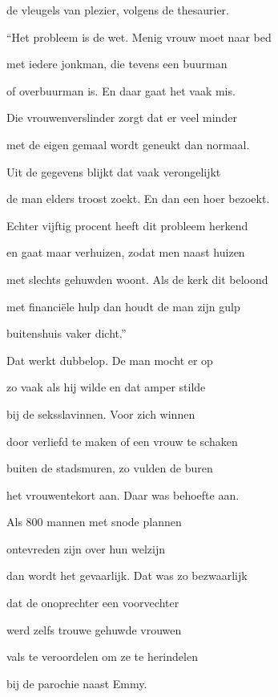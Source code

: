 de vleugels van plezier,
volgens de thesaurier.

“Het probleem is de wet.
Menig vrouw moet naar bed

met iedere jonkman,
die tevens een buurman

of overbuurman is.
En daar gaat het vaak mis.

Die vrouwenverslinder
zorgt dat er veel minder

met de eigen gemaal
wordt geneukt dan normaal.

Uit de gegevens blijkt
dat vaak verongelijkt

de man elders troost zoekt.
En dan een hoer bezoekt.

Echter vijftig procent
heeft dit probleem herkend

en gaat maar verhuizen,
zodat men naast huizen

met slechts gehuwden woont.
Als de kerk dit beloond

met financiële hulp
dan houdt de man zijn gulp

buitenshuis vaker dicht.”

Dat werkt dubbelop.
De man mocht er op

zo vaak als hij wilde
en dat amper stilde

bij de seksslavinnen.
Voor zich winnen

door verliefd te maken
of een vrouw te schaken

buiten de stadsmuren,
zo vulden de buren

het vrouwentekort aan.
Daar was behoefte aan.

Als 800 mannen
met snode plannen

ontevreden zijn
over hun welzijn

dan wordt het gevaarlijk.
Dat was zo bezwaarlijk

dat de onoprechter
een voorvechter

werd zelfs trouwe
gehuwde vrouwen

vals te veroordelen
om ze te herindelen

bij de parochie
naast Emmy.
